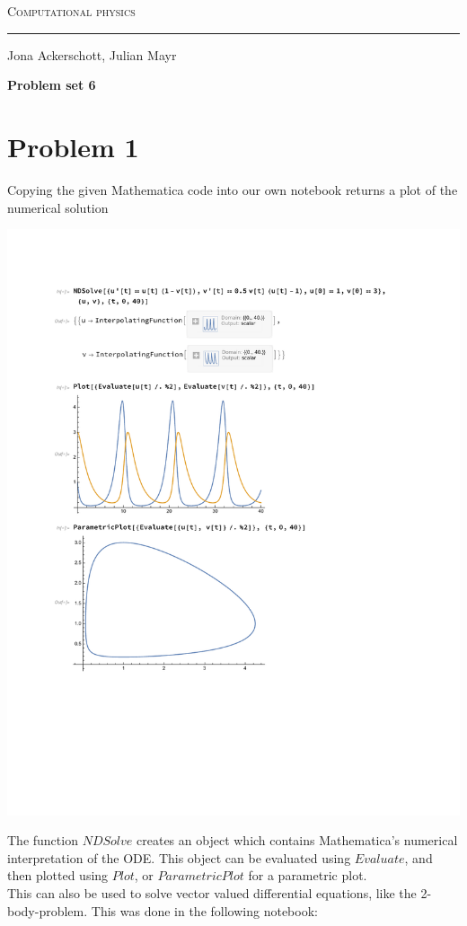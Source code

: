 \documentclass[12pt, a4paper]{article}
\begin{document}
  \centerline{\Huge\scshape Computational physics}
  \vspace*{0.5cm}
  \hrule
  \vspace*{0.5cm}
  \centerline{Jona Ackerschott, Julian Mayr}
  \vspace*{1cm}
  \centerline{\Large\bfseries Problem set 6}
  \vspace*{0.5cm}

  \section*{Problem 1}
  Copying the given Mathematica code into our own notebook returns a plot of the numerical solution
  
  \includegraphics[scale=0.6,page=1]{nb1.pdf}
  
  The function $NDSolve$ creates an object which contains Mathematica's numerical interpretation of the ODE. This object can be evaluated using $Evaluate$, and then plotted using $Plot$, or $ParametricPlot$ for a parametric plot.
\\This can also be used to solve vector valued differential equations, like the 2-body-problem. This was done in the following notebook:
\end{document}
